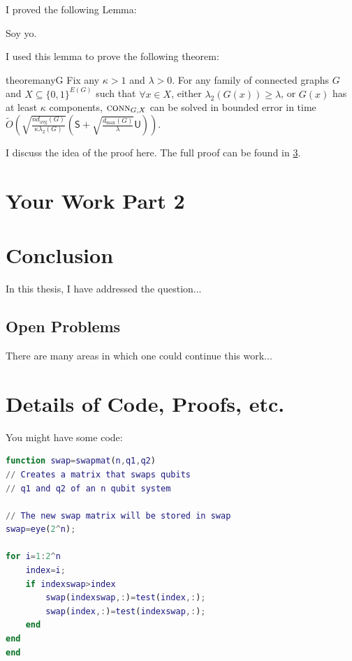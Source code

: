 \documentclass[midd]{thesis}
\begin{document}
I proved the following Lemma:

\begin{lemma}
Soy yo.
\end{lemma}

I used this lemma to prove the following theorem:

\begin{restatable}{theorem}{anyG}\label{thm:any-G}
Fix any $\kappa>1$ and $\lambda>0$. For any family of connected graphs $G$ and
$X\subseteq \{0,1\}^{E(G)}$ such that $\forall x\in X$, either
$\lambda_2(G(x))\geq \lambda$, or $G(x)$ has at least $\kappa$
components, $\textsc{conn}_{G,X}$ can be solved in bounded error in time
$
\widetilde{O}\left(\sqrt{\frac{nd_{\mathrm{avg}}(G)}{\kappa\lambda_2(G)}}\left(\mathsf{S}+\sqrt{\frac{d_{\max}(G)}{\lambda}}\mathsf{U}\right)\right).
$
\end{restatable}

I discuss the idea of the proof here. The full proof can be found in \cref{app:simulation}.


\chapter{Your Work Part 2}

\chapter{Conclusion}
\label{sec:conclude}
In this thesis, I have addressed the question...

\section{Open Problems}
There are many areas in which one could continue this work...



\appendix
\chapter{Details of Code, Proofs, etc.}
\label{app:simulation}
You might have some code:

\begin{lstlisting}[language=matlab]
function swap=swapmat(n,q1,q2)
// Creates a matrix that swaps qubits 
// q1 and q2 of an n qubit system

// The new swap matrix will be stored in swap
swap=eye(2^n);

for i=1:2^n
    index=i;
    if indexswap>index
        swap(indexswap,:)=test(index,:);
        swap(index,:)=test(indexswap,:);
    end
end
end
\end{lstlisting}
\end{document}

